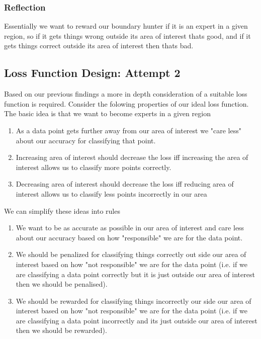 \documentclass{article}
\begin{document}
\subsubsection{Reflection}
Essentially we want to reward our boundary hunter if it is an expert in a given region, so if it gets things wrong outside its area of interest thats good, and if it gets things correct outside its area of interest then thats bad.

\subsection{Loss Function Design: Attempt 2}
Based on our previous findings a more in depth consideration of a suitable loss function is required. Consider the folowing properties of our ideal loss function. The basic idea is that we want to become experts in a given region
\begin{enumerate}
\item As a data point gets further away from our area of interest we "care less" about our accuracy for classifying that point.
\item Increasing area of interest should decrease the loss iff increasing the area of interest allows us to classify more points correctly.
\item Decreasing area of interest should decrease the loss iff reducing area of interest allows us to classify less points incorrectly in our area
\end{enumerate}

We can simplify these ideas into rules

\begin{enumerate}
\item We want to be as accurate as possible in our area of interest and care less about our accuracy based on how "responsible" we are for the data point.
\item We should be penalized for classifying things correctly out side our area of interest based on how "not responsible" we are for the data point (i.e. if we are classifying a data point correctly but it is just outside our area of interest then we should be penalised).
\item We should be rewarded for classifying things incorrectly our side our area of interest based on how "not responsible" we are for the data point (i.e. if we are classifying a data point incorrectly and its just outside our area of interest then we should be rewarded).
\end{enumerate}
\end{document}

